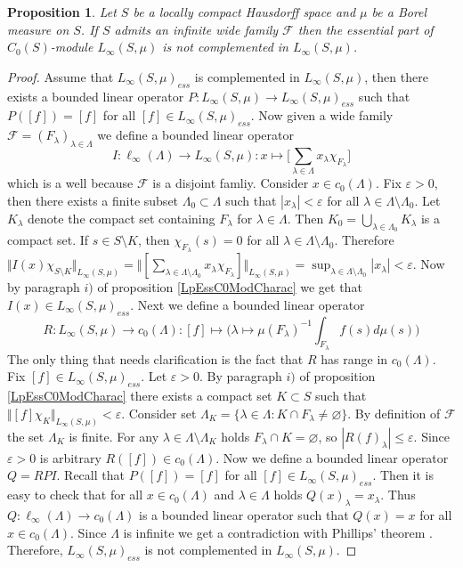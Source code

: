 \documentclass[12pt]{article}
\newtheorem{proposition}[theorem]{Proposition}
\begin{document}
\begin{proposition}\label{LInfEssNotCompl} Let $S$ be a locally compact Hausdorff space and $\mu$ be a Borel measure on $S$. If $S$ admits an infinite wide family $\mathcal{F}$ then the essential part of $C_0(S)$-module $L_\infty(S,\mu)$ is not complemented in $L_\infty(S,\mu)$.
\end{proposition}
\begin{proof} Assume that $L_\infty(S,\mu)_{ess}$ is complemented in $L_\infty(S,\mu)$, then there exists a bounded linear operator $P:L_\infty(S,\mu)\to L_\infty(S,\mu)_{ess}$ such that $P([f])=[f]$ for all $[f]\in L_\infty(S,\mu)_{ess}$. Now given a wide family $\mathcal{F}=(F_\lambda)_{\lambda\in\Lambda}$ we define a bounded linear operator
    $$
        I:\ell_\infty(\Lambda)\to L_\infty(S,\mu): x\mapsto \biggl[\sum_{\lambda\in\Lambda}x_\lambda \chi_{F_\lambda}\biggr]
    $$
    which is a well because $\mathcal{F}$ is a disjoint famliy. Consider $x\in c_0(\Lambda)$. Fix $\varepsilon > 0$, then there exists a finite subset $\Lambda_0\subset\Lambda$ such that $|x_\lambda|<\varepsilon$ for all $\lambda\in\Lambda\setminus\Lambda_0$. Let $K_\lambda$ denote the compact set containing $F_\lambda$ for $\lambda\in\Lambda$. Then $K_0=\bigcup_{\lambda\in\Lambda_0}K_\lambda$ is a compact set. If $s\in S\setminus K$, then $\chi_{F_\lambda}(s)=0$ for all $\lambda\in\Lambda\setminus\Lambda_0$. Therefore $\Vert I(x)\chi_{S\setminus K}\Vert_{L_\infty(S,\mu)}=\Vert[\sum_{\lambda\in\Lambda\setminus\Lambda_0}x_\lambda\chi_{F_\lambda}] \Vert_{L_\infty(S,\mu)}=\sup_{\lambda\in\Lambda\setminus\Lambda_0}|x_\lambda|<\varepsilon$. Now by paragraph $i)$ of proposition \ref{LpEssC0ModCharac} we get that $I(x)\in L_\infty(S,\mu)_{ess}$. Next we define a bounded linear operator
    $$
        R:L_\infty(S,\mu)\to c_0(\Lambda): [f]\mapsto \biggl(\lambda\mapsto\mu(F_\lambda)^{-1}\int_{F_\lambda} f(s)d\mu(s)\biggr)
    $$
    The only thing that needs clarification is the fact that $R$ has range in $c_0(\Lambda)$. Fix $[f]\in L_\infty(S,\mu)_{ess}$. Let $\varepsilon>0$. By paragraph $i)$ of proposition \ref{LpEssC0ModCharac} there exists a compact set $K\subset S$ such that $\Vert [f]\chi_{K}\Vert_{L_\infty(S,\mu)}<\varepsilon$. Consider set $\Lambda_K=\{\lambda\in\Lambda: K\cap F_\lambda\neq\varnothing\}$. By definition of $\mathcal{F}$ the set $\Lambda_K$ is finite. For any $\lambda\in\Lambda\setminus \Lambda_K$ holds $F_\lambda\cap K=\varnothing$, so $|R(f)_\lambda|\leq\varepsilon$. Since $\varepsilon>0$ is arbitrary $R([f])\in c_0(\Lambda)$. Now we define a bounded linear operator $Q=RPI$. Recall that $P([f])=[f]$ for all $[f]\in L_\infty(S,\mu)_{ess}$. Then it is easy to check that for all $x\in c_0(\Lambda)$ and $\lambda\in\Lambda$ holds $Q(x)_\lambda=x_\lambda$. Thus $Q:\ell_\infty(\Lambda)\to c_0(\Lambda)$ is a bounded linear operator such that $Q(x)=x$ for all $x\in c_0(\Lambda)$. Since $\Lambda$ is infinite we get a contradiction with Phillips' theorem \cite{PhilOnLinTran}. Therefore, $L_\infty(S,\mu)_{ess}$ is not complemented in $L_\infty(S,\mu)$.
\end{proof}
\end{document}
